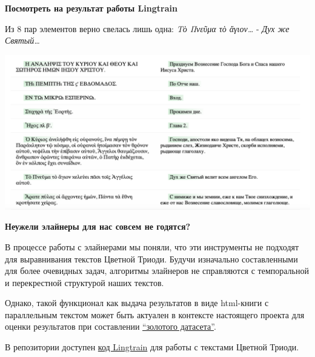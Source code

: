 \documentclass[
  letterpaper,
]{book}
\begin{document}
\begin{tcolorbox}[enhanced jigsaw, colframe=quarto-callout-caution-color-frame, rightrule=.15mm, breakable, arc=.35mm, left=2mm, colback=white, bottomrule=.15mm, toprule=.15mm, leftrule=.75mm, opacityback=0]

\textbf{Посмотреть на результат работы Lingtrain}\vspace{2mm}

Из 8 пар элементов верно свелась лишь одна: \emph{Τὸ Πνεῦμα τὸ
ἄγιον\ldots{}} - \emph{Дух же Святый\ldots{}}

\includegraphics{images/lingtrain_faulty_result.png}

\end{tcolorbox}

\begin{tcolorbox}[enhanced jigsaw, colframe=quarto-callout-note-color-frame, rightrule=.15mm, breakable, arc=.35mm, left=2mm, colback=white, bottomrule=.15mm, toprule=.15mm, leftrule=.75mm, opacityback=0]

\textbf{Неужели элайнеры для нас совсем не годятся?}\vspace{2mm}

В процессе работы с элайнерами мы поняли, что эти инструменты не
подходят для выравнивания текстов Цветной Триоди. Будучи изначально
составленными для более очевидных задач, алгоритмы элайнеров не
справляются с темпоральной и перекрестной структурой наших текстов.

Однако, такой функционал как выдача результатов в виде html-книги с
параллельным текстом может быть актуален в контексте настоящего проекта
для оценки результатов при составлении
\protect\hyperlink{sec-about_evluation}{``золотого датасета''}.

\end{tcolorbox}

В репозитории доступен
\href{https://github.com/Drozhzhinastya/GSPC/blob/main/scripts/aligners/Lingtrain_LABse.ipynb}{код
Lingtrain} для работы с текстами Цветной Триоди.
\end{document}
